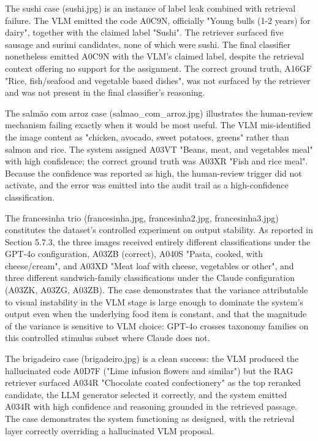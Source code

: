 The sushi case (sushi.jpg) is an instance of label leak combined with retrieval failure. The VLM emitted the code A0C9N, officially "Young bulls (1-2 years) for dairy", together with the claimed label "Sushi". The retriever surfaced five sausage and surimi candidates, none of which were sushi. The final classifier nonetheless emitted A0C9N with the VLM's claimed label, despite the retrieval context offering no support for the assignment. The correct ground truth, A16GF "Rice, fish/seafood and vegetable based dishes", was not surfaced by the retriever and was not present in the final classifier's reasoning.

The salmão com arroz case (salmao\_com\_arroz.jpg) illustrates the human-review mechanism failing exactly when it would be most useful. The VLM mis-identified the image content as "chicken, avocado, sweet potatoes, greens" rather than salmon and rice. The system assigned A03VT "Beans, meat, and vegetables meal" with high confidence; the correct ground truth was A03XR "Fish and rice meal". Because the confidence was reported as high, the human-review trigger did not activate, and the error was emitted into the audit trail as a high-confidence classification.

The francesinha trio (francesinha.jpg, francesinha2.jpg, francesinha3.jpg) constitutes the dataset's controlled experiment on output stability. As reported in Section 5.7.3, the three images received entirely different classifications under the GPT-4o configuration, A03ZB (correct), A040S "Pasta, cooked, with cheese/cream", and A03XD "Meat loaf with cheese, vegetables or other", and three different sandwich-family classifications under the Claude configuration (A03ZK, A03ZG, A03ZB). The case demonstrates that the variance attributable to visual instability in the VLM stage is large enough to dominate the system's output even when the underlying food item is constant, and that the magnitude of the variance is sensitive to VLM choice: GPT-4o crosses taxonomy families on this controlled stimulus subset where Claude does not.

The brigadeiro case (brigadeiro.jpg) is a clean success: the VLM produced the hallucinated code A0D7F ("Lime infusion flowers and similar") but the RAG retriever surfaced A034R "Chocolate coated confectionery" as the top reranked candidate, the LLM generator selected it correctly, and the system emitted A034R with high confidence and reasoning grounded in the retrieved passage. The case demonstrates the system functioning as designed, with the retrieval layer correctly overriding a hallucinated VLM proposal.
